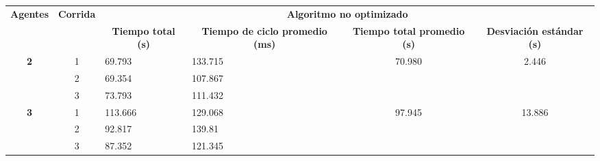 \begin{table}[H]
	\centering
	\resizebox{\textwidth}{!} {
	\begin{tabular}{|c|c|llcc|}
		\hline
		\multirow{2}{*}{\textbf{Agentes}} & \multirow{2}{*}{\textbf{Corrida}} & \multicolumn{4}{c|}{\textbf{Algoritmo no optimizado}}                                                                                                                                                     \\ \cline{3-6} 
		&                                   & \multicolumn{1}{c|}{\textbf{Tiempo total (s)}} & \multicolumn{1}{c|}{\textbf{Tiempo de ciclo promedio (ms)}} & \multicolumn{1}{c|}{\textbf{Tiempo total promedio (s)}} & \textbf{Desviación estándar (s)} \\ \hline
		\multirow{3}{*}{\textbf{2}}       & 1                                 & \multicolumn{1}{l|}{69.793}                    & \multicolumn{1}{l|}{133.715}                                & \multicolumn{1}{c|}{\multirow{3}{*}{70.980}}            & \multirow{3}{*}{2.446}           \\ \cline{2-4}
		& 2                                 & \multicolumn{1}{l|}{69.354}                    & \multicolumn{1}{l|}{107.867}                                & \multicolumn{1}{c|}{}                                   &                                  \\ \cline{2-4}
		& 3                                 & \multicolumn{1}{l|}{73.793}                    & \multicolumn{1}{l|}{111.432}                                & \multicolumn{1}{c|}{}                                   &                                  \\ \hline
		\multirow{3}{*}{\textbf{3}}       & 1                                 & \multicolumn{1}{l|}{113.666}                   & \multicolumn{1}{l|}{129.068}                                & \multicolumn{1}{c|}{\multirow{3}{*}{97.945}}            & \multirow{3}{*}{13.886}          \\ \cline{2-4}
		& 2                                 & \multicolumn{1}{l|}{92.817}                    & \multicolumn{1}{l|}{139.81}                                 & \multicolumn{1}{c|}{}                                   &                                  \\ \cline{2-4}
		& 3                                 & \multicolumn{1}{l|}{87.352}                    & \multicolumn{1}{l|}{121.345}                                & \multicolumn{1}{c|}{}                                   &                                  \\ \hline

\end{tabular}}
\end{table}
